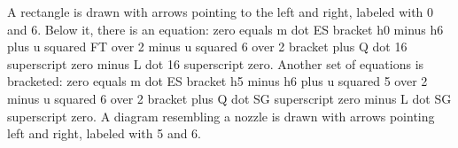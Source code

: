 A rectangle is drawn with arrows pointing to the left and right, labeled with 0 and 6. Below it, there is an equation: zero equals m dot ES bracket h0 minus h6 plus u squared FT over 2 minus u squared 6 over 2 bracket plus Q dot 16 superscript zero minus L dot 16 superscript zero. Another set of equations is bracketed: zero equals m dot ES bracket h5 minus h6 plus u squared 5 over 2 minus u squared 6 over 2 bracket plus Q dot SG superscript zero minus L dot SG superscript zero. A diagram resembling a nozzle is drawn with arrows pointing left and right, labeled with 5 and 6.